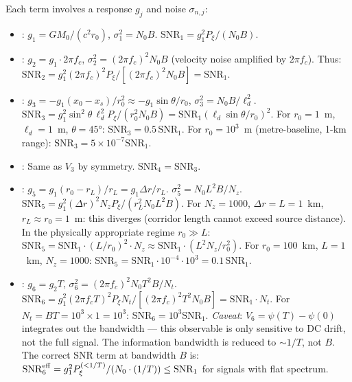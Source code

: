 \documentclass[aps,prd,twocolumn,superscriptaddress,nofootinbib]{revtex4-2}
\newcommand{\SNR}{\mathrm{SNR}}
\begin{document}
Each term involves a response $g_j$ and noise $\sigma_{n,j}$:
\begin{itemize}
\item[$V_1$]: $g_1 = GM_0/(c^2 r_0)$, $\sigma_1^2 = N_0 B$.
  $\SNR_1 = g_1^2 P_\xi / (N_0 B)$.
\item[$V_2$]: $g_2 = g_1 \cdot 2\pi f_c$, $\sigma_2^2 = (2\pi f_c)^2 N_0 B$
  (velocity noise amplified by $2\pi f_c$). Thus:
  $\SNR_2 = g_1^2 (2\pi f_c)^2 P_\xi / [(2\pi f_c)^2 N_0 B] = \SNR_1$.
\item[$V_3$]: $g_3 = -g_1 (x_0-x_s)/r_0^2 \approx -g_1 \sin\theta/r_0$,
  $\sigma_3^2 = N_0 B/\ell_d^2$.
  $\SNR_3 = g_1^2 \sin^2\!\theta\, \ell_d^2 P_\xi / (r_0^2 N_0 B) = \SNR_1 (\ell_d \sin\theta/r_0)^2$.
  For $r_0 = 1$~m, $\ell_d = 1$~m, $\theta = 45°$: $\SNR_3 = 0.5\,\SNR_1$.
  For $r_0 = 10^3$~m (metre-baseline, 1-km range): $\SNR_3 = 5\times 10^{-7}\SNR_1$.
\item[$V_4$]: Same as $V_3$ by symmetry. $\SNR_4 = \SNR_3$.
\item[$V_5$]: $g_5 = g_1(r_0-r_L)/r_L = g_1 \Delta r/r_L$.
  $\sigma_5^2 = N_0 L^2 B/N_z$.
  $\SNR_5 = g_1^2 (\Delta r)^2 N_z P_\xi / (r_L^2 N_0 L^2 B)$.
  For $N_z = 1000$, $\Delta r = L = 1$~km, $r_L \approx r_0 = 1$~m:
  this diverges (corridor length cannot exceed source distance).
  In the physically appropriate regime $r_0 \gg L$:
  $\SNR_5 = \SNR_1 \cdot (L/r_0)^2 \cdot N_z \approx \SNR_1 \cdot (L^2 N_z/r_0^2)$.
  For $r_0 = 100$~km, $L = 1$~km, $N_z = 1000$: $\SNR_5 = \SNR_1 \cdot 10^{-4} \cdot 10^3 = 0.1\,\SNR_1$.
\item[$V_6$]: $g_6 = g_2 T$, $\sigma_6^2 = (2\pi f_c)^2 N_0 T^2 B/N_t$.
  $\SNR_6 = g_1^2 (2\pi f_c T)^2 P_\xi N_t / [(2\pi f_c)^2 T^2 N_0 B]
  = \SNR_1 \cdot N_t$.
  For $N_t = BT = 10^3 \times 1 = 10^3$: $\SNR_6 = 10^3 \SNR_1$.
  \emph{Caveat}: $V_6 = \psi(T) - \psi(0)$ integrates out the bandwidth --- this observable
  is only sensitive to DC drift, not the full signal. The information bandwidth
  is reduced to $\sim 1/T$, not $B$. The correct SNR term at bandwidth $B$ is:
  $\SNR_6^{\rm eff} = g_1^2 P_\xi^{(<1/T)} / (N_0 \cdot (1/T)) \leq \SNR_1$ for
  signals with flat spectrum.
\end{itemize}
\end{document}
